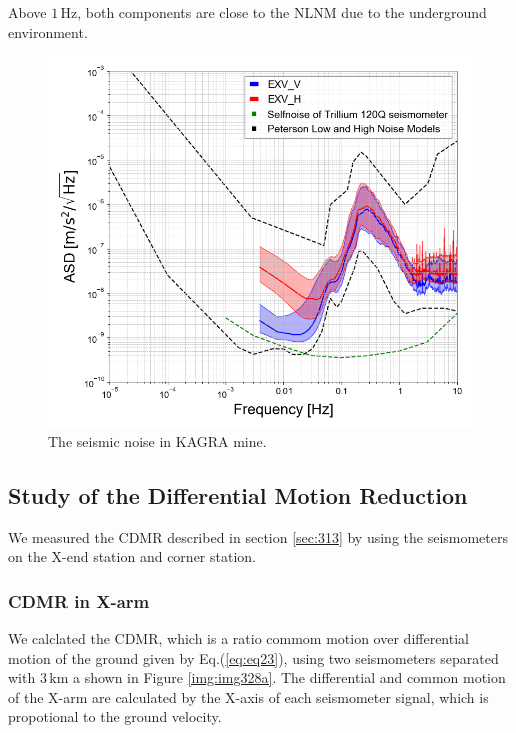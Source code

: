 Above $1\,\mathrm{Hz}$, both components are close to the NLNM due to the underground environment.

\begin{figure}[h]
  \includegraphics[width=13.0cm]{./img_chap3/img313.png}
  \caption{ The seismic noise in KAGRA mine.}\label{img:img313}
\end{figure}



\subsection{Study of the Differential Motion Reduction} \label{sec:332}
We measured the CDMR described in section \cref{sec:313} by using the seismometers on the X-end station and corner station.
\subsubsection{CDMR in X-arm }
We calclated the CDMR, which is a ratio commom motion over differential motion of the ground given by Eq.(\ref{eq:eq23}), using two seismometers separated with $3\,\mathrm{km}$ a shown in Figure \ref{img:img328a}. The differential and common motion of the X-arm are calculated by the X-axis of each seismometer signal, which is propotional to the ground velocity. 

